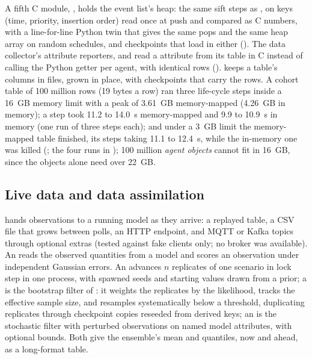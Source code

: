 A fifth C module, , holds the event list's heap: the same sift steps as
, on keys (time, priority, insertion order) read once at push and compared as C
numbers, with a line-for-line Python twin that gives the same pops and the same heap array on
random schedules, and checkpoints that load in either ().
The data collector's attribute reporters,  and  read a
 attribute from its table in C instead of calling the Python getter per agent,
with identical rows ().  keeps a
table's columns in  files, grown in place, with checkpoints that carry the
rows. A cohort table of 100 million rows (19 bytes a row) ran three life-cycle steps inside a 16~GB
 memory limit with a peak of 3.61~GB memory-mapped (4.26~GB in memory); a step
took 11.2 to 14.0~s memory-mapped and 9.9 to 10.9~s in memory (one run of three steps each);
and under a 3~GB limit the memory-mapped table finished, its steps taking 11.1 to 12.4~s,
while the in-memory one was killed (; the four runs in
); 100 million \emph{agent objects} cannot fit
in 16~GB, since the objects alone need over 22~GB.

\subsection{Live data and data assimilation}
\label{app:assimilation}

 hands observations to a running model as they arrive: a replayed table,
a CSV file that grows between polls, an HTTP endpoint, and MQTT or Kafka topics through
optional extras (tested against fake clients only; no broker was available). An
 reads the observed quantities from a model and scores an
observation under independent Gaussian errors. An  advances $n$ replicates of
one scenario in lock step in one process, with spawned seeds and starting values drawn from a
prior; a  is the bootstrap filter of \citet{gordon1993novel}: it weights
the replicates by the likelihood, tracks the effective sample size, and resamples
systematically \citep{douc2005comparison} below a threshold, duplicating replicates through
checkpoint copies reseeded from derived keys; an  is the
stochastic filter with perturbed observations \citep{evensen1994sequential, evensen2003ensemble}
on named model attributes, with optional bounds. Both give the ensemble's mean and quantiles,
now and ahead, as a long-format table.

